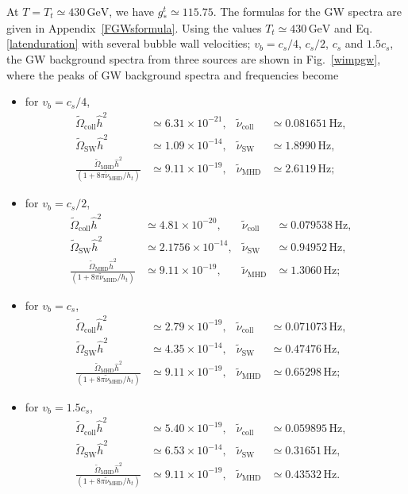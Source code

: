 \documentclass[a4paper,preprint,superscriptaddress,preprintnumbers,nofootinbib]{revtex4}
\newcommand{\al}[1]{\begin{align}#1\end{align}}
\begin{document}
At $T=T_t\simeq 430\,\text{GeV}$, we have $g_*^t\simeq 115.75$.
The formulas for the GW spectra are given in Appendix~\ref{FGWsformula}.
Using the values $T_t\simeq 430\,\text{GeV}$ and Eq.\,\eqref{latenduration} with several bubble wall velocities; $v_b=c_s/4$, $c_s/2$, $c_s$ and $1.5c_s$, the GW background spectra from three sources are shown in Fig.~\ref{wimpgw}, where the peaks of GW background spectra and frequencies become
\begin{itemize}
\item for $v_b=c_s/4$,
\al{
{\tilde \Omega}_\text{coll}{\hat h}^2&\simeq 6.31\times 10^{-21},&
\tilde \nu_\text{coll}&\simeq 0.081651\,\text{Hz},&\\
{\tilde \Omega}_\text{SW}{\hat h}^2&\simeq 1.09\times 10^{-14},&
\tilde \nu_\text{SW}&\simeq 1.8990\,\text{Hz},&\\
\frac{{\tilde \Omega}_\text{MHD}{\hat h}^2}{\left( 1+8\pi {\tilde \nu}_\text{MHD}/h_t \right)}&\simeq 9.11\times 10^{-19},&
\tilde \nu_\text{MHD}&\simeq 2.6119\,\text{Hz};&
}
\item for $v_b=c_s/2$,
\al{
{\tilde \Omega}_\text{coll}{\hat h}^2&\simeq 4.81\times 10^{-20},&
\tilde \nu_\text{coll}&\simeq 0.079538\,\text{Hz},&\\
{\tilde \Omega}_\text{SW}{\hat h}^2&\simeq 2.1756\times 10^{-14},&
\tilde \nu_\text{SW}&\simeq 0.94952\,\text{Hz},&\\
\frac{{\tilde \Omega}_\text{MHD}{\hat h}^2}{\left( 1+8\pi {\tilde \nu}_\text{MHD}/h_t \right)}&\simeq 9.11\times 10^{-19},&
\tilde \nu_\text{MHD}&\simeq 1.3060\,\text{Hz};&
}
\item for $v_b=c_s$,
\al{
{\tilde \Omega}_\text{coll}{\hat h}^2&\simeq 2.79\times 10^{-19},&
\tilde \nu_\text{coll}&\simeq 0.071073\,\text{Hz},&\\
{\tilde \Omega}_\text{SW}{\hat h}^2&\simeq 4.35\times 10^{-14},&
\tilde \nu_\text{SW}&\simeq 0.47476\,\text{Hz},&\\
\frac{{\tilde \Omega}_\text{MHD}{\hat h}^2}{\left( 1+8\pi {\tilde \nu}_\text{MHD}/h_t \right)}&\simeq 9.11\times 10^{-19},&
\tilde \nu_\text{MHD}&\simeq 0.65298\,\text{Hz};&
}
\item for $v_b=1.5c_s$,
\al{
{\tilde \Omega}_\text{coll}{\hat h}^2&\simeq 5.40\times 10^{-19},&
\tilde \nu_\text{coll}&\simeq 0.059895\,\text{Hz},&\\
{\tilde \Omega}_\text{SW}{\hat h}^2&\simeq 6.53\times10^{-14},&
\tilde \nu_\text{SW}&\simeq 0.31651\,\text{Hz},&\\
\frac{{\tilde \Omega}_\text{MHD}{\hat h}^2}{\left( 1+8\pi {\tilde \nu}_\text{MHD}/h_t \right)}&\simeq 9.11\times 10^{-19},&
\tilde \nu_\text{MHD}&\simeq 0.43532\,\text{Hz}.&
}
\end{itemize}
\end{document}
